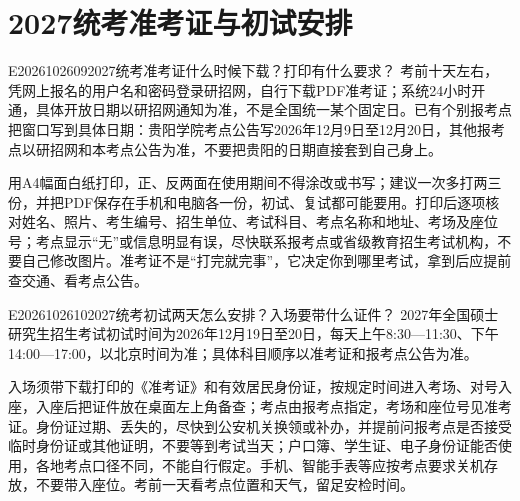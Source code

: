 \section{2027统考准考证与初试安排}
\begin{qa}{E2026102609}{2027统考准考证什么时候下载？打印有什么要求？}
考前十天左右，凭网上报名的用户名和密码登录研招网，自行下载PDF准考证；系统24小时开通，具体开放日期以研招网通知为准，不是全国统一某个固定日。已有个别报考点把窗口写到具体日期：贵阳学院考点公告写2026年12月9日至12月20日，其他报考点以研招网和本考点公告为准，不要把贵阳的日期直接套到自己身上。

用A4幅面白纸打印，正、反两面在使用期间不得涂改或书写；建议一次多打两三份，并把PDF保存在手机和电脑各一份，初试、复试都可能要用。打印后逐项核对姓名、照片、考生编号、招生单位、考试科目、考点名称和地址、考场及座位号；考点显示“无”或信息明显有误，尽快联系报考点或省级教育招生考试机构，不要自己修改图片。准考证不是“打完就完事”，它决定你到哪里考试，拿到后应提前查交通、看考点公告。
\end{qa}

\begin{qa}{E2026102610}{2027统考初试两天怎么安排？入场要带什么证件？}
2027年全国硕士研究生招生考试初试时间为2026年12月19日至20日，每天上午8:30—11:30、下午14:00—17:00，以北京时间为准；具体科目顺序以准考证和报考点公告为准。

入场须带下载打印的《准考证》和有效居民身份证，按规定时间进入考场、对号入座，入座后把证件放在桌面左上角备查；考点由报考点指定，考场和座位号见准考证。身份证过期、丢失的，尽快到公安机关换领或补办，并提前问报考点是否接受临时身份证或其他证明，不要等到考试当天；户口簿、学生证、电子身份证能否使用，各地考点口径不同，不能自行假定。手机、智能手表等应按考点要求关机存放，不要带入座位。考前一天看考点位置和天气，留足安检时间。
\end{qa}

